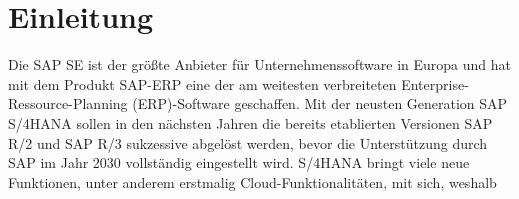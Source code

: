 \section{Einleitung}
Die SAP SE ist der größte Anbieter für Unternehmenssoftware in Europa und hat mit dem Produkt SAP-ERP eine der am weitesten verbreiteten Enterprise-Ressource-Planning (ERP)-Software geschaffen. Mit der neusten Generation SAP S/4HANA sollen in den nächsten Jahren die bereits etablierten Versionen SAP R/2 und SAP R/3 sukzessive abgelöst werden, bevor die Unterstützung durch SAP im Jahr 2030 vollständig eingestellt wird. S/4HANA bringt viele neue Funktionen, unter anderem erstmalig Cloud-Funktionalitäten, mit sich, weshalb  
